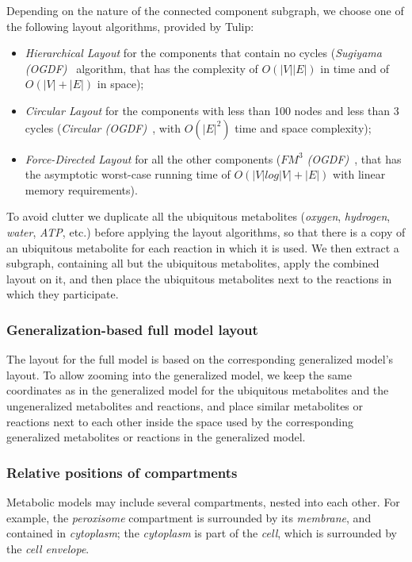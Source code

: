 \documentclass{bmcart}
\begin{document}
Depending on the nature of the connected component subgraph, we choose one of the following layout algorithms, provided by Tulip:
\begin{itemize}
\item \emph{Hierarchical Layout} for the components that contain no cycles (\emph{Sugiyama (OGDF)}~\cite{Sugiyama1981} algorithm, that has the complexity of $O(|V||E|)$ in time and of $O(|V| + |E|)$ in space);
\item \emph{Circular Layout} for the components with less than 100 nodes and less than 3 cycles (\emph{Circular (OGDF)}~\cite{Tamassia:2007:HGD:1202383}, with $O(|E|^2)$ time and space complexity);
\item \emph{Force-Directed Layout} for all the other components (\emph{$FM^3$ (OGDF)}~\cite{Hachul2005}, that has the asymptotic worst-case running time of $O(|V|log|V|+|E|)$ with linear memory requirements).
\end{itemize}

To avoid clutter we duplicate all the ubiquitous metabolites (\textit{oxygen}, \textit{hydrogen}, \textit{water}, \textit{ATP}, etc.) before applying the layout algorithms, so that there is a copy of an ubiquitous metabolite for each reaction in which it is used. We then extract a subgraph, containing all but the ubiquitous metabolites, apply the combined layout on it, and then place the ubiquitous metabolites next to the reactions in which they participate.

\subsubsection*{Generalization-based full model layout}
The layout for the full model is based on the corresponding generalized model's layout. To allow zooming into the generalized model, we keep the same coordinates as in the generalized model for the ubiquitous metabolites and the ungeneralized metabolites and reactions, and place similar metabolites or reactions next to each other inside the space used by the corresponding generalized metabolites or reactions in the generalized model.

\subsubsection*{Relative positions of compartments}
Metabolic models may include several compartments, nested into each other. For example, the \emph{peroxisome} compartment is surrounded by its \emph{membrane}, and contained in \emph{cytoplasm}; the \emph{cytoplasm} is part of the \emph{cell}, which is surrounded by the \emph{cell envelope}.
\end{document}
